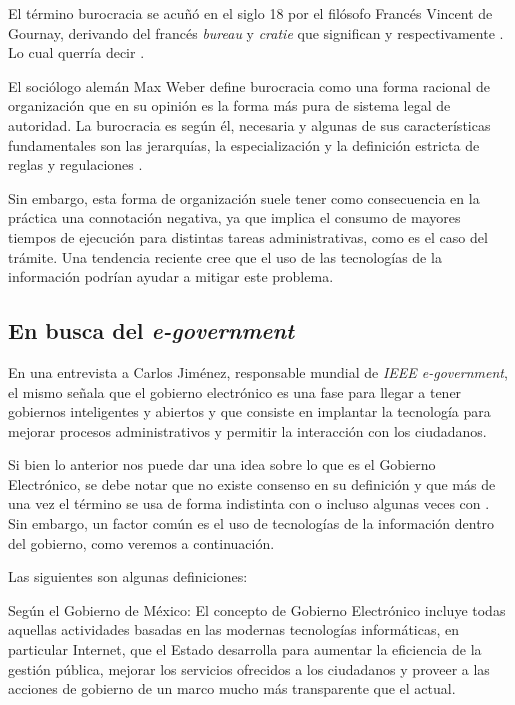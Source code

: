 El término burocracia se acuñó en el siglo 18 por el filósofo Francés Vincent de
Gournay, derivando del francés \textit{bureau} y \textit{cratie} que significan
 y  respectivamente
\cite{britannicabureaucracy}. Lo cual querría decir .

El sociólogo alemán Max Weber define burocracia como una forma racional de
organización que en su opinión es la forma más pura de sistema legal de
autoridad. La burocracia es según él, necesaria y algunas de sus características
fundamentales son las jerarquías, la especialización y la definición estricta
de reglas y regulaciones \cite{brajnikdictionaryofpublicadmin}.

Sin embargo, esta forma de organización suele tener como consecuencia en la
práctica una connotación negativa, ya que implica el consumo de mayores tiempos
de ejecución para distintas tareas administrativas, como es el caso del trámite.
Una tendencia reciente cree que el uso de las tecnologías de la información
podrían ayudar a mitigar este problema.

\subsection{En busca del \textit{e-government}}

En una entrevista a Carlos Jiménez, responsable mundial de \textit{IEEE e-government}, el mismo señala que el gobierno electrónico es una fase para llegar a tener gobiernos inteligentes y abiertos y que consiste en implantar la tecnología para mejorar procesos administrativos y permitir la interacción con los ciudadanos.

Si bien lo anterior nos puede dar una idea sobre lo que es el Gobierno Electrónico, se debe notar que no existe consenso en su definición y que más de una vez el término se usa de forma indistinta con  o incluso algunas veces con . Sin embargo, un factor común es el uso de tecnologías de la información dentro del gobierno, como veremos a continuación.

Las siguientes son algunas definiciones:

Según el Gobierno de México: El concepto de Gobierno Electrónico incluye todas aquellas actividades basadas en las modernas tecnologías informáticas, en particular Internet, que el Estado desarrolla para aumentar la eficiencia de la gestión pública, mejorar los servicios ofrecidos a los ciudadanos y proveer a las acciones de gobierno de un marco mucho más transparente que el actual.

